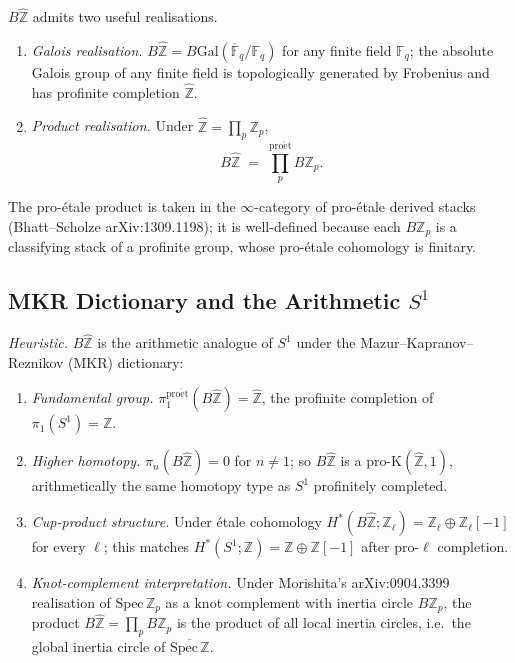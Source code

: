 \begin{remark}
\label{v4-arith:bzn:rem:B-Z-hat-realisations}
\(B\widehat{\mathbb{Z}}\) admits two useful realisations.
\begin{enumerate}
\item \emph{Galois realisation.}
\(B\widehat{\mathbb{Z}}=B\mathrm{Gal}(\overline{\mathbb{F}}_{q}/\mathbb{F}_{q})\)
for any finite field \(\mathbb{F}_{q}\); the absolute Galois group
of any finite field is topologically generated by Frobenius and
has profinite completion \(\widehat{\mathbb{Z}}\).
\item \emph{Product realisation.} Under
\(\widehat{\mathbb{Z}}=\prod_{p}\mathbb{Z}_{p}\),
\begin{equation}
B\widehat{\mathbb{Z}}\;=\;\prod_{p}^{\mathrm{pro\acute{e}t}}B\mathbb{Z}_{p}.
\end{equation}
\end{enumerate}
The pro-\'etale product is taken in the \(\infty\)-category of
pro-\'etale derived stacks (Bhatt--Scholze arXiv:1309.1198);
it is well-defined because each \(B\mathbb{Z}_{p}\) is a classifying
stack of a profinite group, whose pro-\'etale cohomology is
finitary.
\end{remark}

\subsection{MKR Dictionary and the Arithmetic \(S^{1}\)}

\begin{proposition}
\label{v4-arith:bzn:prop:MKR-inertia-circle}
\emph{Heuristic.} 
\(B\widehat{\mathbb{Z}}\) is the arithmetic analogue of \(S^{1}\)
under the Mazur--Kapranov--Reznikov (MKR) dictionary:
\begin{enumerate}
\item \emph{Fundamental group.}
\(\pi_{1}^{\mathrm{pro\acute{e}t}}(B\widehat{\mathbb{Z}})=\widehat{\mathbb{Z}}\),
the profinite completion of \(\pi_{1}(S^{1})=\mathbb{Z}\).
\item \emph{Higher homotopy.} \(\pi_{n}(B\widehat{\mathbb{Z}})=0\)
for \(n\neq 1\); so \(B\widehat{\mathbb{Z}}\) is a pro-\(\mathrm{K}(\widehat{\mathbb{Z}},1)\),
arithmetically the same homotopy type as \(S^{1}\) profinitely
completed.
\item \emph{Cup-product structure.} Under \'etale cohomology
\(H^{*}(B\widehat{\mathbb{Z}};\mathbb{Z}_{\ell})=\mathbb{Z}_{\ell}\oplus\mathbb{Z}_{\ell}[-1]\)
for every \(\ell\); this matches
\(H^{*}(S^{1};\mathbb{Z})=\mathbb{Z}\oplus\mathbb{Z}[-1]\)
after pro-\(\ell\) completion.
\item \emph{Knot-complement interpretation.} Under Morishita's
arXiv:0904.3399 realisation of \(\mathrm{Spec}\,\mathbb{Z}_{p}\)
as a knot complement with inertia circle \(B\mathbb{Z}_{p}\), the
product \(B\widehat{\mathbb{Z}}=\prod_{p}B\mathbb{Z}_{p}\) is the
product of all local inertia circles, i.e.\ the global inertia
circle of \(\overline{\mathrm{Spec}\,\mathbb{Z}}\).
\end{enumerate}
\end{proposition}

